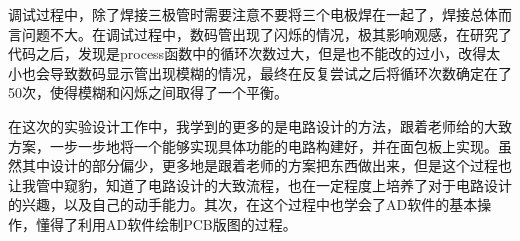\documentclass{../source/zjureport}
\begin{document}
    调试过程中，除了焊接三极管时需要注意不要将三个电极焊在一起了，焊接总体而言问题不大。在调试过程中，数码管出现了闪烁的情况，极其影响观感，在研究了代码之后，发现是process函数中的循环次数过大，但是也不能改的过小，改得太小也会导致数码显示管出现模糊的情况，最终在反复尝试之后将循环次数确定在了50次，使得模糊和闪烁之间取得了一个平衡。
    
    
    在这次的实验设计工作中，我学到的更多的是电路设计的方法，跟着老师给的大致方案，一步一步地将一个能够实现具体功能的电路构建好，并在面包板上实现。虽然其中设计的部分偏少，更多地是跟着老师的方案把东西做出来，但是这个过程也让我管中窥豹，知道了电路设计的大致流程，也在一定程度上培养了对于电路设计的兴趣，以及自己的动手能力。其次，在这个过程中也学会了AD软件的基本操作，懂得了利用AD软件绘制PCB版图的过程。

    \newpage
    
\end{document}
